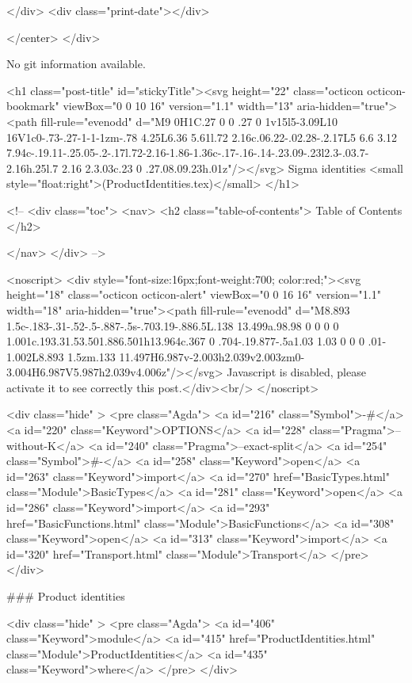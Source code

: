           
        </div>
        <div class="print-date"></div>
        
        
    </center>
  </div>

  
  No git information available.
  

  <h1 class="post-title" id="stickyTitle"><svg height="22" class="octicon octicon-bookmark" viewBox="0 0 10 16" version="1.1" width="13" aria-hidden="true"><path fill-rule="evenodd" d="M9 0H1C.27 0 0 .27 0 1v15l5-3.09L10 16V1c0-.73-.27-1-1-1zm-.78 4.25L6.36 5.61l.72 2.16c.06.22-.02.28-.2.17L5 6.6 3.12 7.94c-.19.11-.25.05-.2-.17l.72-2.16-1.86-1.36c-.17-.16-.14-.23.09-.23l2.3-.03.7-2.16h.25l.7 2.16 2.3.03c.23 0 .27.08.09.23h.01z"/></svg> Sigma identities <small style="float:right">(ProductIdentities.tex)</small>
  </h1>

  <!-- 
  <div class="toc">
    <nav>
    <h2 class="table-of-contents"> Table of Contents </h2>
      

    </nav>
  </div>
   -->

  <noscript>
  <div style="font-size:16px;font-weight:700; color:red;"><svg height="18" class="octicon octicon-alert" viewBox="0 0 16 16" version="1.1" width="18" aria-hidden="true"><path fill-rule="evenodd" d="M8.893 1.5c-.183-.31-.52-.5-.887-.5s-.703.19-.886.5L.138 13.499a.98.98 0 0 0 0 1.001c.193.31.53.501.886.501h13.964c.367 0 .704-.19.877-.5a1.03 1.03 0 0 0 .01-1.002L8.893 1.5zm.133 11.497H6.987v-2.003h2.039v2.003zm0-3.004H6.987V5.987h2.039v4.006z"/></svg> Javascript is disabled, please activate it to see correctly this post.</div><br/>
  </noscript>

  <div class="hide" >
<pre class="Agda">
<a id="216" class="Symbol">{-#</a> <a id="220" class="Keyword">OPTIONS</a> <a id="228" class="Pragma">--without-K</a> <a id="240" class="Pragma">--exact-split</a> <a id="254" class="Symbol">#-}</a>
<a id="258" class="Keyword">open</a> <a id="263" class="Keyword">import</a> <a id="270" href="BasicTypes.html" class="Module">BasicTypes</a>
<a id="281" class="Keyword">open</a> <a id="286" class="Keyword">import</a> <a id="293" href="BasicFunctions.html" class="Module">BasicFunctions</a>
<a id="308" class="Keyword">open</a> <a id="313" class="Keyword">import</a> <a id="320" href="Transport.html" class="Module">Transport</a>
</pre>
</div>

### Product identities

<div class="hide" >
<pre class="Agda">
<a id="406" class="Keyword">module</a>
  <a id="415" href="ProductIdentities.html" class="Module">ProductIdentities</a>
  <a id="435" class="Keyword">where</a>
</pre>
</div>


